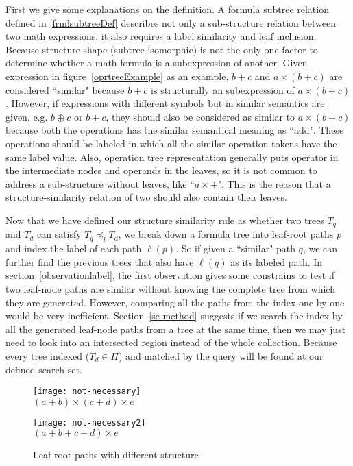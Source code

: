 First we give some explanations on the definition.
A formula subtree relation defined in \ref{frmlsubtreeDef} describes not only a sub-structure relation between two math expressions, it also requires a label similarity and leaf inclusion.
Because structure shape (subtree isomorphic) is not the only one factor to determine whether a math formula is a subexpression of another. 
Given expression in figure~\ref{oprtreeExample} as an example, $b+c$ and $a \times (b+c)$ are considered ``similar" because $b+c$ is structurally an subexpression of $a \times (b+c)$.
However, if expressions with different symbols but in similar semantics are given, e.g. $b \oplus c$ or $b \pm c$, 
they should also be considered as similar to $a \times (b+c)$ because both the operations has the similar semantical meaning as ``add". 
These operations should be labeled in which all the similar operation tokens have the same label value. 
Also, operation tree representation generally puts operator in the intermediate nodes and operands in the leaves, so it is not common to address a sub-structure without leaves, like ``$a \times + $". 
This is the reason that a structure-similarity relation of two should also contain their leaves.

Now that we have defined our structure similarity rule as whether two trees $T_q$ and $T_d$ can satisfy $T_q \preceq_l T_d$,
we break down a formula tree into leaf-root paths $p$ and index the label of each path $\ell(p)$. So if given a ``similar" path $q$, we can further find the previous trees that also have $\ell(q)$ as its labeled path.
In section~\ref{observationlabel}, the first observation gives some constrains to test if two leaf-node paths are similar without knowing the complete tree from which they are generated.
However, comparing all the paths from the index one by one would be very inefficient. Section~\ref{se-method} suggests if we search the index by all the generated leaf-node paths from a tree at the same time, then we may just need to look into an intersected region instead of the whole collection.
Because every tree indexed ($T_d \in \Pi$) and matched by the query will be found at our defined search set.

\begin{figure}
\begin{minipage}[b]{2.65in}
\begin{center}
\texttt{[image: not-necessary]}
\\ $(a+b) \times (c+d) \times e$
\end{center}
\end{minipage}
\hspace*{.38in}
\begin{minipage}[b]{2.65in}
\begin{center}
{\texttt{[image: not-necessary2]}}
\\ $(a+b+c+d) \times e$
\end{center}
\end{minipage}
\caption{Leaf-root paths with different structure}\label{notnecessary}
\end{figure}

